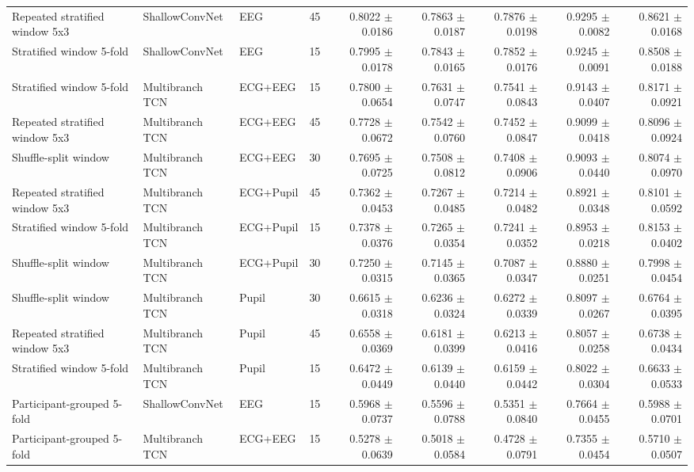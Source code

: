 \begin{table}[htbp]
{\begin{tabular}{lllrrrrrr}
Repeated stratified window 5x3 & ShallowConvNet & EEG & 45 & 0.8022 $\pm$ 0.0186 & 0.7863 $\pm$ 0.0187 & 0.7876 $\pm$ 0.0198 & 0.9295 $\pm$ 0.0082 & 0.8621 $\pm$ 0.0168 \\
Stratified window 5-fold & ShallowConvNet & EEG & 15 & 0.7995 $\pm$ 0.0178 & 0.7843 $\pm$ 0.0165 & 0.7852 $\pm$ 0.0176 & 0.9245 $\pm$ 0.0091 & 0.8508 $\pm$ 0.0188 \\
Stratified window 5-fold & Multibranch TCN & ECG+EEG & 15 & 0.7800 $\pm$ 0.0654 & 0.7631 $\pm$ 0.0747 & 0.7541 $\pm$ 0.0843 & 0.9143 $\pm$ 0.0407 & 0.8171 $\pm$ 0.0921 \\
Repeated stratified window 5x3 & Multibranch TCN & ECG+EEG & 45 & 0.7728 $\pm$ 0.0672 & 0.7542 $\pm$ 0.0760 & 0.7452 $\pm$ 0.0847 & 0.9099 $\pm$ 0.0418 & 0.8096 $\pm$ 0.0924 \\
Shuffle-split window & Multibranch TCN & ECG+EEG & 30 & 0.7695 $\pm$ 0.0725 & 0.7508 $\pm$ 0.0812 & 0.7408 $\pm$ 0.0906 & 0.9093 $\pm$ 0.0440 & 0.8074 $\pm$ 0.0970 \\
Repeated stratified window 5x3 & Multibranch TCN & ECG+Pupil & 45 & 0.7362 $\pm$ 0.0453 & 0.7267 $\pm$ 0.0485 & 0.7214 $\pm$ 0.0482 & 0.8921 $\pm$ 0.0348 & 0.8101 $\pm$ 0.0592 \\
Stratified window 5-fold & Multibranch TCN & ECG+Pupil & 15 & 0.7378 $\pm$ 0.0376 & 0.7265 $\pm$ 0.0354 & 0.7241 $\pm$ 0.0352 & 0.8953 $\pm$ 0.0218 & 0.8153 $\pm$ 0.0402 \\
Shuffle-split window & Multibranch TCN & ECG+Pupil & 30 & 0.7250 $\pm$ 0.0315 & 0.7145 $\pm$ 0.0365 & 0.7087 $\pm$ 0.0347 & 0.8880 $\pm$ 0.0251 & 0.7998 $\pm$ 0.0454 \\
Shuffle-split window & Multibranch TCN & Pupil & 30 & 0.6615 $\pm$ 0.0318 & 0.6236 $\pm$ 0.0324 & 0.6272 $\pm$ 0.0339 & 0.8097 $\pm$ 0.0267 & 0.6764 $\pm$ 0.0395 \\
Repeated stratified window 5x3 & Multibranch TCN & Pupil & 45 & 0.6558 $\pm$ 0.0369 & 0.6181 $\pm$ 0.0399 & 0.6213 $\pm$ 0.0416 & 0.8057 $\pm$ 0.0258 & 0.6738 $\pm$ 0.0434 \\
Stratified window 5-fold & Multibranch TCN & Pupil & 15 & 0.6472 $\pm$ 0.0449 & 0.6139 $\pm$ 0.0440 & 0.6159 $\pm$ 0.0442 & 0.8022 $\pm$ 0.0304 & 0.6633 $\pm$ 0.0533 \\
Participant-grouped 5-fold & ShallowConvNet & EEG & 15 & 0.5968 $\pm$ 0.0737 & 0.5596 $\pm$ 0.0788 & 0.5351 $\pm$ 0.0840 & 0.7664 $\pm$ 0.0455 & 0.5988 $\pm$ 0.0701 \\
Participant-grouped 5-fold & Multibranch TCN & ECG+EEG & 15 & 0.5278 $\pm$ 0.0639 & 0.5018 $\pm$ 0.0584 & 0.4728 $\pm$ 0.0791 & 0.7355 $\pm$ 0.0454 & 0.5710 $\pm$ 0.0507 \\

\end{tabular}}
\end{table}
